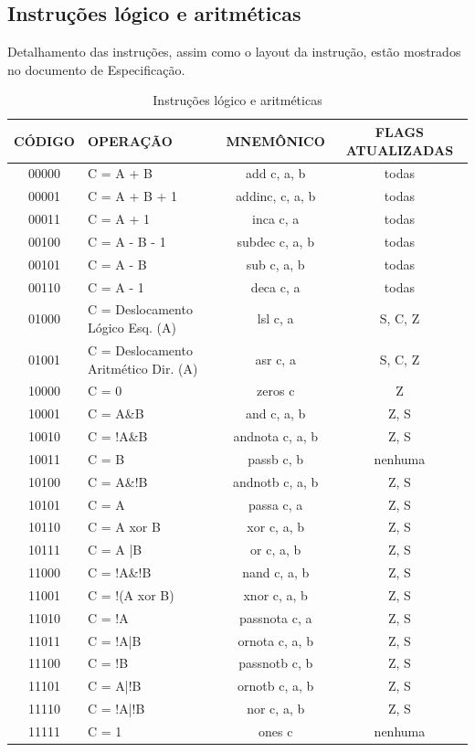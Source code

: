 \documentclass{article}
\begin{document}
\subsection{Instruções lógico e aritméticas}
    Detalhamento das instruções, assim como o layout da instrução, estão mostrados no documento de Especificação.
    \newpage
	\begin{table}[H]
	\centering
	\begin{tabular}{|c|m{6cm}|c|c|}
  	\hline 
  	\textbf{CÓDIGO} & \textbf{OPERAÇÃO} & \textbf{MNEMÔNICO} & \textbf{FLAGS ATUALIZADAS} \\ 
  	\hline   	
  	00000 & C = A + B & add c, a, b & todas \\ \hline
  	00001 & C = A + B + 1 & addinc, c, a, b & todas \\ \hline
  	00011 & C = A + 1 & inca c, a & todas \\ \hline
  	00100 & C = A - B - 1 & subdec c, a, b & todas \\ \hline
  	00101 & C = A - B & sub c, a, b & todas \\ \hline
  	00110  & C = A - 1 & deca c, a & todas \\ \hline
  	01000 & C = Deslocamento Lógico Esq. (A) & lsl c, a & S, C, Z \\ \hline
  	01001 & C = Deslocamento Aritmético Dir. (A) & asr c, a & S, C, Z \\ \hline
  	10000 & C = 0 & zeros c & Z \\ \hline
    10001 & C = A\&B & and c, a, b & Z, S \\ \hline
    10010 & C = !A\&B & andnota c, a, b & Z, S \\ \hline
    10011 & C = B & passb c, b & nenhuma \\ \hline
    10100 & C = A\&!B & andnotb c, a, b & Z, S \\ \hline
    10101 & C = A & passa c, a & Z, S \\ \hline
    10110 & C = A xor B & xor c, a, b & Z, S \\ \hline
    10111 & C = A |B & or c, a, b & Z, S \\ \hline
    11000 & C = !A\&!B & nand c, a, b & Z, S \\ \hline
    11001 & C = !(A xor B) & xnor c, a, b & Z, S \\ \hline
    11010 & C = !A & passnota c, a & Z, S \\ \hline
    11011 & C = !A|B & ornota c, a, b & Z, S \\ \hline
    11100 & C = !B & passnotb c, b & Z, S \\ \hline
    11101 & C = A|!B & ornotb c, a, b & Z, S \\ \hline
    11110 & C = !A|!B & nor c, a, b & Z, S \\ \hline
    11111 & C = 1 & ones c & nenhuma \\ \hline
  	\end{tabular} 
  	\caption{Instruções lógico e aritméticas}
  \end{table}
  \newpage    
\end{document}
